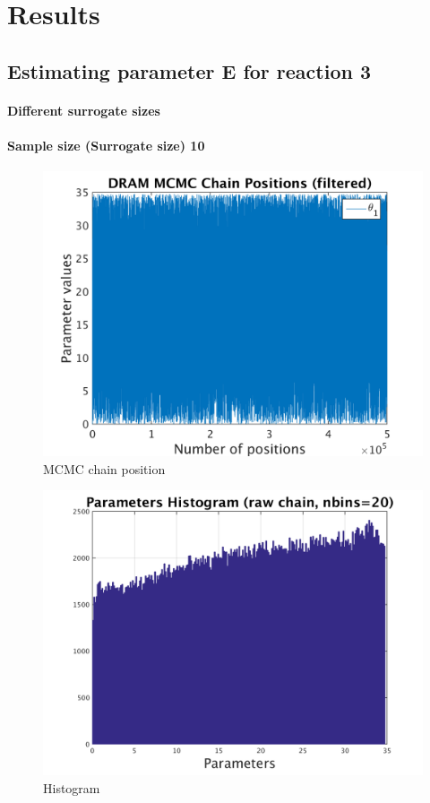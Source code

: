 \chapter{Results}

\section{Estimating parameter E for reaction 3}
\subsubsection{Different surrogate sizes }
\subsubsection{Sample size (Surrogate size) 10 }

\begin{figure}[h!]
  
  \centering
   \includegraphics[scale=0.75]{output_10/simple_ip_chain_pos_filt}
   \caption{MCMC chain position }
\end{figure}


\begin{figure}[h!]
  
  \centering
   \includegraphics[scale=0.75]{output_10/simple_ip_hist_raw}
   \caption{Histogram}
\end{figure}



